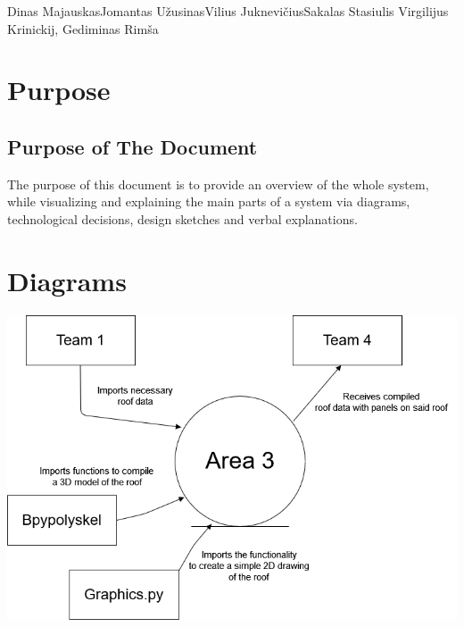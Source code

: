 \documentclass[a4paper,12pt,fleqn]{article}
\begin{document}
 {Dinas Majauskas}{Jomantas Užusinas}{Vilius Juknevičius}{Sakalas Stasiulis}%
 {Virgilijus Krinickij, Gediminas Rimša}

\tableofcontents


\newpage
\section{Purpose}

\subsection{Purpose of The Document}
The purpose of this document is to provide an overview of the whole system, while visualizing and explaining the main parts of a system via diagrams, technological decisions, design sketches and verbal explanations. 

\section{Diagrams}
\begin{center}
    \includegraphics[scale=0.4]{main/images/system-context-diagram.png}
\end{center}
\end{document}
